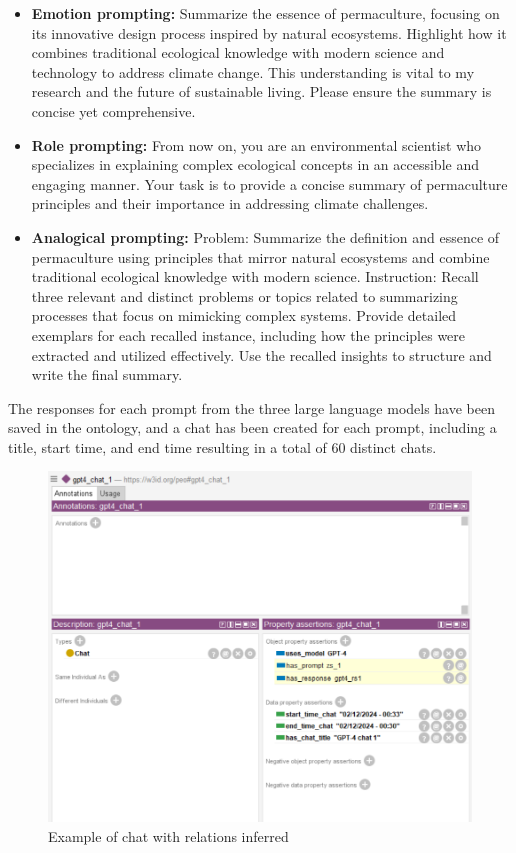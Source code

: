 \begin{itemize}
    \item \textbf{Emotion prompting:} Summarize the essence of permaculture, focusing on its innovative design process inspired by natural ecosystems. Highlight how it combines traditional ecological knowledge with modern science and technology to address climate change. This understanding is vital to my research and the future of sustainable living. Please ensure the summary is concise yet comprehensive.
    \item \textbf{Role prompting:} From now on, you are an environmental scientist who specializes in explaining complex ecological concepts in an accessible and engaging manner. Your task is to provide a concise summary of permaculture principles and their importance in addressing climate challenges.
    \item \textbf{Analogical prompting:} Problem: Summarize the definition and essence of permaculture using principles that mirror natural ecosystems and combine traditional ecological knowledge with modern science. Instruction: Recall three relevant and distinct problems or topics related to summarizing processes that focus on mimicking complex systems. Provide detailed exemplars for each recalled instance, including how the principles were extracted and utilized effectively. Use the recalled insights to structure and write the final summary.
\end{itemize}
The responses for each prompt from the three large language models have been saved in the ontology, and a chat has been created for each prompt, including a title, start time, and end time resulting in a total of 60 distinct chats.
\begin{figure}[H]
    \centering
    \includegraphics[width=0.75\linewidth]{Figures/fig_32.png}
    \caption{Example of chat with relations inferred}
    \label{fig:enter-label}
\end{figure}

